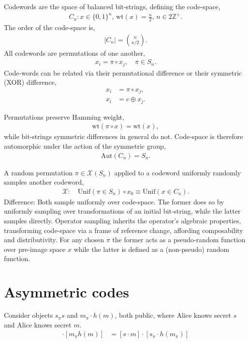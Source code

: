 \documentclass[twocolumn, aps, amsmath, amssymb, nofootinbib, superscriptaddress, longbibliography, doublefloatfix, table-of-contents, eqsecnum, rmp]{revtex4-2}
\begin{document}
Codewords are the space of balanced bit-strings, defining the code-space,
\begin{align}
	C_n: x\in\{0,1\}^n,\, \mathrm{wt}(x)=\frac{n}{2},\, n\in 2\mathbb{Z}^+.
\end{align}
The order of the code-space is,
\begin{align}
	|C_n| = \binom{n}{n/2}.
\end{align}
All codewords are permutations of one another,
\begin{align}
	x_i = \pi \circ x_j,\quad \pi\in S_n.
\end{align}
Code-words can be related via their permutational difference or their symmetric (XOR) difference,
\begin{align}
	x_i &= \pi \circ x_j,\nonumber\\
	x_i &= c \oplus x_j.
\end{align}

Permutations preserve Hamming weight,
\begin{align}
	\mathrm{wt}(\pi\circ x) = \mathrm{wt}(x),
\end{align}
while bit-strings symmetric differences in general do not. Code-space is therefore automorphic under the action of the symmetric group,
\begin{align}
	\mathrm{Aut}(C_n) = S_n.
\end{align}


A random permutation $\pi\in\mathcal{X}(S_n)$ applied to a codeword uniformly randomly samples another codeword,
\begin{align}
	\mathcal{X}:\quad \mathrm{Unif}(\pi\in S_n) \circ x_0 \equiv \mathrm{Unif}(x\in C_n).
\end{align}
Difference: Both sample uniformly over code-space. The former does so by uniformly sampling over transformations of an initial bit-string, while the latter samples directly. Operator sampling inherits the operator's algebraic properties, transforming code-space via a frame of reference change, affording composability and distributivity. For any chosen $\pi$ the former acts as a pseudo-random function over pre-image space $x$ while the latter is defined as a (non-pseudo) random function.

\section{Asymmetric codes}

Consider objects $s_\pi s$ and $m_\pi \cdot h(m)$, both public, where Alice knows secret $s$ and Alice knows secret $m$.
\begin{align}
	[s_\pi s] \cdot [m_\pi h(m)] &= [s \cdot m] \cdot [s_\pi \cdot h(m_\pi)]
\end{align}
\end{document}
